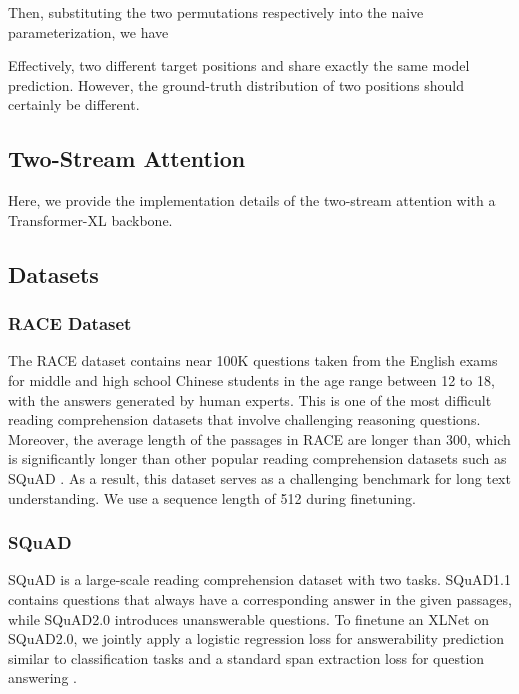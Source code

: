 \documentclass{article}
\begin{document}
Then, substituting the two permutations respectively into the naive parameterization, we have

Effectively, two different target positions  and  share exactly the same model prediction. 
However, the ground-truth distribution of two positions should certainly be different. 




\subsection{Two-Stream Attention}
\label{sec:two-stream-detail}
Here, we provide the implementation details of the two-stream attention with a Transformer-XL backbone.




\subsection{Datasets} \label{sec:datasets}

\subsubsection{RACE Dataset}

The RACE dataset \cite{lai2017large} contains near 100K questions taken from the English exams for middle and high school Chinese students in the age range between 12 to 18, with the answers generated by human experts. This is one of the most difficult reading comprehension datasets that involve challenging reasoning questions. Moreover, the average length of the passages in RACE are longer than 300, which is significantly longer than other popular reading comprehension datasets such as SQuAD \cite{rajpurkar2018know}. As a result, this dataset serves as a challenging benchmark for long text understanding. We use a sequence length of 512 during finetuning.

\subsubsection{SQuAD}

SQuAD is a large-scale reading comprehension dataset with two tasks. SQuAD1.1 \cite{rajpurkar2016squad} contains questions that always have a corresponding answer in the given passages, while SQuAD2.0 \cite{rajpurkar2018know} introduces unanswerable questions. To finetune an XLNet on SQuAD2.0, we jointly apply a logistic regression loss for answerability prediction similar to classification tasks and a standard span extraction loss for question answering \cite{devlin2018bert}.
\end{document}
